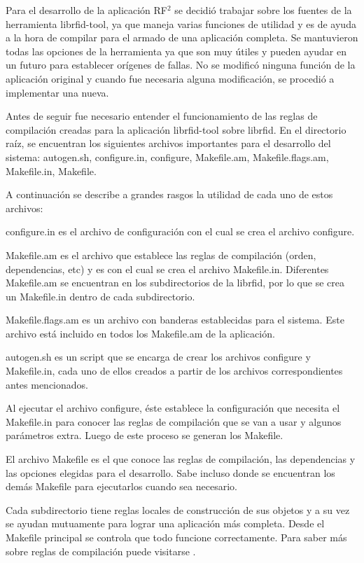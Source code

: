 Para el desarrollo de la aplicación RF$^{2}$ se decidió trabajar sobre los fuentes de la herramienta librfid-tool, ya que maneja varias funciones de utilidad y es de ayuda a la hora de compilar para el armado de una aplicación completa. Se mantuvieron todas las opciones de la herramienta ya que son muy útiles y pueden ayudar en un futuro para establecer orígenes de fallas. No se modificó ninguna función de la aplicación original y cuando fue necesaria alguna modificación, se procedió a implementar una nueva.

\bigskip
Antes de seguir fue necesario entender el funcionamiento de las reglas de compilación creadas para la aplicación librfid-tool sobre librfid. En el directorio raíz, se encuentran los siguientes archivos importantes para el desarrollo del sistema: autogen.sh, configure.in, configure, Makefile.am, Makefile.flags.am, Makefile.in, Makefile.

\bigskip
A continuación se describe a grandes rasgos la utilidad de cada uno de estos archivos:

\bigskip
configure.in es el archivo de configuración con el cual se crea el archivo configure.


Makefile.am es el archivo que establece las reglas de compilación (orden, dependencias, etc) y es con el cual se crea el archivo Makefile.in. Diferentes Makefile.am se encuentran en los subdirectorios de la librfid, por lo que se crea un Makefile.in dentro de cada subdirectorio.


Makefile.flags.am es un archivo con banderas establecidas para el sistema. Este archivo está incluido en todos los Makefile.am de la aplicación.


autogen.sh es un script que se encarga de crear los archivos configure y Makefile.in, cada uno de ellos creados a partir de los archivos correspondientes antes mencionados.

Al ejecutar el archivo configure, éste establece la configuración que necesita el Makefile.in para conocer las reglas de compilación que se van a usar y algunos parámetros extra. Luego de este proceso se generan los Makefile.

El archivo Makefile es el que conoce las reglas de compilación, las dependencias y las opciones elegidas para el desarrollo. Sabe incluso donde se encuentran los demás Makefile para ejecutarlos cuando sea necesario.

\bigskip
Cada subdirectorio tiene reglas locales de construcción de sus objetos y a su vez se ayudan mutuamente para lograr una aplicación más completa. Desde el Makefile principal se controla que todo funcione correctamente.
Para saber más sobre reglas de compilación puede visitarse \cite{Make}.

